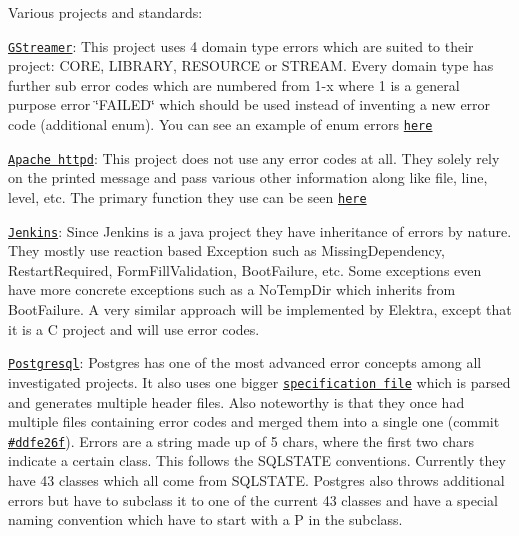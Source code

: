 Various projects and standards\+:


\begin{DoxyItemize}
\item \href{https://github.com/GStreamer/gstreamer}{\tt G\+Streamer}\+: This project uses 4 domain type errors which are suited to their project\+: C\+O\+RE, L\+I\+B\+R\+A\+RY, R\+E\+S\+O\+U\+R\+CE or S\+T\+R\+E\+AM. Every domain type has further sub error codes which are numbered from 1-\/x where 1 is a general purpose error \char`\"{}\+F\+A\+I\+L\+E\+D\char`\"{} which should be used instead of inventing a new error code (additional enum). You can see an example of enum errors \href{https://github.com/GStreamer/gstreamer/blob/a7db80f9a98287f012108845e121f6f6fb62171b/gst/gsterror.h#L63-L80}{\tt here}
\item \href{https://github.com/apache/httpd}{\tt Apache httpd}\+: This project does not use any error codes at all. They solely rely on the printed message and pass various other information along like file, line, level, etc. The primary function they use can be seen \href{https://github.com/apache/httpd/blob/1acebd4933e5315c669605c3c9222ed8bb0ee9ea/include/http_log.h#L378-L403}{\tt here}
\item \href{https://github.com/jenkinsci/jenkins}{\tt Jenkins}\+: Since Jenkins is a java project they have inheritance of errors by nature. They mostly use reaction based Exception such as {\ttfamily Missing\+Dependency}, {\ttfamily Restart\+Required}, {\ttfamily Form\+Fill\+Validation}, {\ttfamily Boot\+Failure}, etc. Some exceptions even have more concrete exceptions such as a {\ttfamily No\+Temp\+Dir} which inherits from {\ttfamily Boot\+Failure}. A very similar approach will be implemented by Elektra, except that it is a C project and will use error codes.
\item \href{https://github.com/postgres/postgres}{\tt Postgresql}\+: Postgres has one of the most advanced error concepts among all investigated projects. It also uses one bigger \href{https://github.com/postgres/postgres/blob/master/src/backend/utils/errcodes.txt}{\tt specification file} which is parsed and generates multiple header files. Also noteworthy is that they once had multiple files containing error codes and merged them into a single one (commit \href{https://github.com/postgres/postgres/commit/ddfe26f6441c24660595c5efe5fd0bd3974cdc5c}{\tt \#ddfe26f}). Errors are a string made up of 5 chars, where the first two chars indicate a certain class. This follows the S\+Q\+L\+S\+T\+A\+TE conventions. Currently they have 43 classes which all come from S\+Q\+L\+S\+T\+A\+TE. Postgres also throws additional errors but have to subclass it to one of the current 43 classes and have a special naming convention which have to start with a {\ttfamily P} in the subclass.

\end{DoxyItemize}
